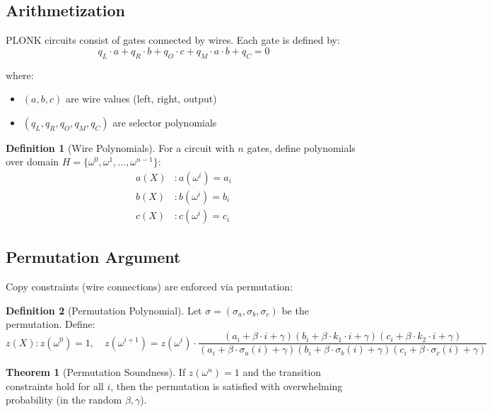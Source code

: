 \documentclass[11pt,a4paper]{article}
\theoremstyle{definition}
\newtheorem{definition}{Definition}
\newtheorem{theorem}{Theorem}
\begin{document}
\subsection{Arithmetization}

PLONK circuits consist of gates connected by wires. Each gate is defined by:
\[
q_L \cdot a + q_R \cdot b + q_O \cdot c + q_M \cdot a \cdot b + q_C = 0
\]

where:
\begin{itemize}
    \item $(a, b, c)$ are wire values (left, right, output)
    \item $(q_L, q_R, q_O, q_M, q_C)$ are selector polynomials
\end{itemize}

\begin{definition}[Wire Polynomials]
    For a circuit with $n$ gates, define polynomials over domain $H = \{\omega^0, \omega^1, \ldots, \omega^{n-1}\}$:
    \begin{align}
        a(X) &: a(\omega^i) = a_i \\
        b(X) &: b(\omega^i) = b_i \\
        c(X) &: c(\omega^i) = c_i
    \end{align}
\end{definition}

\subsection{Permutation Argument}

Copy constraints (wire connections) are enforced via permutation:

\begin{definition}[Permutation Polynomial]
    Let $\sigma = (\sigma_a, \sigma_b, \sigma_c)$ be the permutation. Define:
    \[
    z(X) : z(\omega^0) = 1, \quad z(\omega^{i+1}) = z(\omega^i) \cdot \frac{(a_i + \beta \cdot i + \gamma)(b_i + \beta \cdot k_1 \cdot i + \gamma)(c_i + \beta \cdot k_2 \cdot i + \gamma)}{(a_i + \beta \cdot \sigma_a(i) + \gamma)(b_i + \beta \cdot \sigma_b(i) + \gamma)(c_i + \beta \cdot \sigma_c(i) + \gamma)}
    \]
\end{definition}

\begin{theorem}[Permutation Soundness]
    If $z(\omega^n) = 1$ and the transition constraints hold for all $i$, then the permutation is satisfied with overwhelming probability (in the random $\beta, \gamma$).
\end{theorem}
\end{document}

